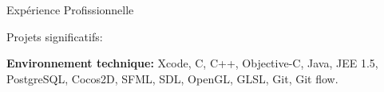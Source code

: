 \documentclass{resume}
\begin{document}
\begin{rSection}{Expérience Profissionnelle}
\begin{rSubsection}{Projets significatifs:}{}{}{}
    \end{rSubsection}

    {\fontsize{8}{9}\selectfont \textbf{Environnement technique:} Xcode, C, C++, Objective-C, Java, JEE 1.5, PostgreSQL, Cocos2D, SFML, SDL, OpenGL, GLSL, Git, Git flow.}


\end{rSection}
\end{document}
